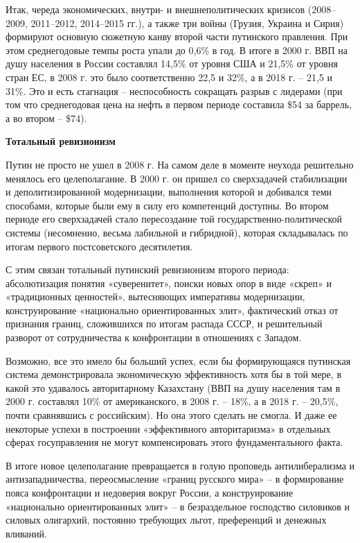 Итак, череда экономических, внутри- и внешнеполитических кризисов (2008–2009, 2011–2012, 2014–2015 гг.), а также три войны (Грузия, Украина и Сирия) формируют основную сюжетную канву второй части путинского правления. При этом среднегодовые темпы роста упали до 0,6\% в год. В итоге в 2000 г. ВВП на душу населения в России составлял 14,5\% от уровня США и 21,5\% от уровня стран ЕС, в 2008 г. это было соответственно 22,5 и 32\%, а в 2018 г. – 21,5 и 31\%. Это и есть стагнация – неспособность сокращать разрыв с лидерами (при том что среднегодовая цена на нефть в первом периоде составила \$54 за баррель, а во втором – \$74).

\textbf{Тотальный ревизионизм}

Путин не просто не ушел в 2008 г. На самом деле в моменте неухода решительно менялось его целеполагание. В 2000 г. он пришел со сверхзадачей стабилизации и деполитизированной модернизации, выполнения которой и добивался теми способами, которые были ему в силу его компетенций доступны. Во втором периоде его сверхзадачей стало пересоздание той государственно-политической системы (несомненно, весьма лабильной и гибридной), которая складывалась по итогам первого постсоветского десятилетия.

С этим связан тотальный путинский ревизионизм второго периода: абсолютизация понятия «суверенитет», поиски новых опор в виде «скреп» и «традиционных ценностей», вытесняющих императивы модернизации, конструирование «национально ориентированных элит», фактический отказ от признания границ, сложившихся по итогам распада СССР, и решительный разворот от сотрудничества к конфронтации в отношениях с Западом.

Возможно, все это имело бы больший успех, если бы формирующаяся путинская система демонстрировала экономическую эффективность хотя бы в той мере, в какой это удавалось авторитарному Казахстану (ВВП на душу населения там в 2000 г. составлял 10\% от американского, в 2008 г. – 18\%, а в 2018 г. – 20,5\%, почти сравнявшись с российским). Но она этого сделать не смогла. И даже ее некоторые успехи в построении «эффективного авторитаризма» в отдельных сферах госуправления не могут компенсировать этого фундаментального факта.

В итоге новое целеполагание превращается в голую проповедь антилиберализма и антизападничества, переосмысление «границ русского мира» – в формирование пояса конфронтации и недоверия вокруг России, а конструирование «национально ориентированных элит» – в безраздельное господство силовиков и силовых олигархий, постоянно требующих льгот, преференций и денежных вливаний.

